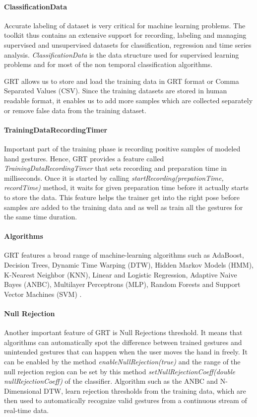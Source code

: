 \paragraph*{ClassificationData} Accurate labeling of dataset is very critical for machine learning problems. The toolkit thus contains an extensive support for recording, labeling and managing supervised and unsupervised datasets for classification, regression and time series analysis. \textit{ClassificationData} is the data structure used for supervised learning problems and for most of the non temporal classification algorithms.

GRT allows us to store and load the training data in GRT format or Comma Separated Values (CSV). Since the training datasets are stored in human readable format, it enables us to add more samples which are collected separately or remove false data from the training dataset.

\paragraph*{TrainingDataRecordingTimer} Important part of the training phase is recording positive samples of modeled hand gestures. Hence, GRT provides a feature called \textit{TrainingDataRecordingTimer} that sets recording and preparation time in milliseconds. Once it is started by calling \textit{startRecording(prepationTime, recordTime)} method, it waits for given preparation time before it actually starts to store the data. This feature helps the trainer get into the right pose before samples are added to the training data and as well as train all the gestures for the same time duration.

\paragraph*{Algorithms} GRT features a broad range of machine-learning algorithms such as AdaBoost, Decision Trees, Dynamic Time Warping (DTW), Hidden Markov Models (HMM), K-Nearest Neighbor (KNN), Linear and Logistic Regression, Adaptive Naive Bayes (ANBC), Multilayer Perceptrons (MLP), Random Forests and Support Vector Machines (SVM) \cite{16}. 

\paragraph*{Null Rejection} Another important feature of GRT is Null Rejections threshold. It means that algorithms can automatically spot the difference between trained gestures and unintended gestures that can happen when the user moves the hand in freely. It can be enabled by the method \textit{enableNullRejection(true)} and the range of the null rejection region can be set by this method \textit{setNullRejectionCoeff(double nullRejectionCoeff)} of the classifier. Algorithm such as the ANBC and N-Dimensional DTW, learn rejection thresholds from the training data, which are then used to automatically recognize valid gestures from a continuous stream of real-time data.

